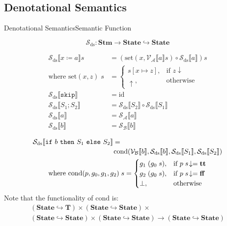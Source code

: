 \documentclass{beamer}
\newcommand{\Stm}{\textbf{Stm}}
\newcommand{\State}{\textbf{State}}
\newcommand{\T}{\textbf{T}}
\newcommand{\sskip}{\texttt{skip}}
\newcommand{\ifelse}[3]{\mathtt{if}\ #1\ \mathtt{then}\ #2\ \mathtt{else}\ #3}
\newcommand{\sem}[2]{\mathcal{#1} \llbracket #2 \rrbracket}
\newcommand{\tr}{\mathbf{tt}}
\newcommand{\ff}{\mathbf{ff}}
\newcommand{\undefined}{\uparrow}
\newcommand{\defined}{\!\downarrow}
\begin{document}
\subsection{Denotational Semantics}
\begin{frame}{Denotational Semantics}{Semantic Function}

    $$\mathcal{S}_{\mathrm{ds}}: \Stm \to \State \hookrightarrow \State$$
    \begin{overprint}
        \begin{align*}
            \sem{S_{\mathrm{ds}}}{x \coloneq a}s & =
            (\mathrm{set}(x, \sem{V_A}{a}s) \circ \sem{S_\mathrm{ds}}{a})s \\
            \mbox{where } \mathrm{set}(x, z)\;s  & =
            \begin{cases}
                s[x \mapsto z], & \mbox{if } z\defined \\
                \undefined,     & \mbox{otherwise}
            \end{cases}                         \\
            \sem{S_{\mathrm{ds}}}{\sskip}        & =
            \mathrm{id}                                                    \\
            \sem{S_{\mathrm{ds}}}{S_1; S_2}      & =
            \sem{S_{\mathrm{ds}}}{S_2} \circ \sem{S_{\mathrm{ds}}}{S_1}    \\
            \sem{S_{\mathrm{ds}}}{a}             & =
            \sem{S_A}{a}                                                   \\
            \sem{S_{\mathrm{ds}}}{b}             & =
            \sem{S_B}{b}
        \end{align*}

        \begin{gather*}
            \begin{multlined}[][0.8\textwidth]
                \sem{S_{\mathrm{ds}}}{\ifelse{b}{S_1}{S_2}} = \\
                \mathrm{cond}(\sem{V_B}{b}, \sem{S_\mathrm{ds}}{b}, \sem{S_{\mathrm{ds}}}{S_1}, \sem{S_{\mathrm{ds}}}{S_2})
            \end{multlined} \\
            \mbox{where } \mathrm{cond}(p, g_0, g_1, g_2)\;s =
            \begin{cases}
                g_1\;(g_0\;s), & \mbox{if } p\;s\defined = \tr \\
                g_2\;(g_0\;s), & \mbox{if } p\;s\defined = \ff \\
                \bot,          & \mbox{otherwise}
            \end{cases}
        \end{gather*}
        Note that the functionality of $\mathrm{cond}$ is:
        \begin{multline*}
            (\State \hookrightarrow \T) \times (\State \hookrightarrow \State) \times \\
            (\State \hookrightarrow \State) \times (\State \hookrightarrow \State) \to (\State \hookrightarrow \State)
        \end{multline*}


\end{overprint}
\end{frame}
\end{document}
